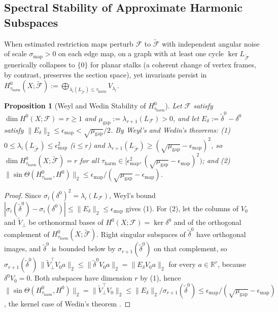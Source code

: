 \documentclass[11pt,a4paper]{article}
\newtheorem{proposition}{Proposition}
\theoremstyle{definition}
\theoremstyle{remark}
\newcommand{\R}{\mathbb{R}}
\begin{document}
\subsection{Spectral Stability of Approximate Harmonic Subspaces}

When estimated restriction maps perturb $\mathcal{F}$ to $\widetilde{\mathcal{F}}$ with independent angular noise of scale $\sigma_{\mathrm{map}} > 0$ on each edge map, on a graph with at least one cycle $\ker L_{\widetilde{\mathcal{F}}}$ generically collapses to $\{0\}$ for planar stalks (a coherent change of vertex frames, by contrast, preserves the section space), yet invariants persist in $H^0_{\tau_{\mathrm{harm}}}(X;\widetilde{\mathcal{F}}) := \bigoplus_{\lambda_i(L_{\widetilde{\mathcal{F}}}) \le \tau_{\mathrm{harm}}} V_{\lambda_i}$.

\begin{proposition}[Weyl and Wedin Stability of $H^0_{\tau_{\mathrm{harm}}}$]
\label{prop:davis_kahan}
Let $\mathcal{F}$ satisfy $\dim H^0(X;\mathcal{F}) = r \ge 1$ and $\mu_{\mathrm{gap}} := \lambda_{r+1}(L_{\mathcal{F}}) > 0$, and let $E_\delta := \tilde{\delta}^0 - \delta^0$ satisfy $\|E_\delta\|_2 \le \epsilon_{\mathrm{map}} < \sqrt{\mu_{\mathrm{gap}}}/2$. By Weyl's \cite{weyl1912asymptotische} and Wedin's \cite{wedin1972perturbation} theorems: (1) $0 \le \lambda_i(L_{\widetilde{\mathcal{F}}}) \le \epsilon_{\mathrm{map}}^2$ ($i \le r$) and $\lambda_{r+1}(L_{\widetilde{\mathcal{F}}}) \ge (\sqrt{\mu_{\mathrm{gap}}} - \epsilon_{\mathrm{map}})^2$, so $\dim H^0_{\tau_{\mathrm{harm}}}(X;\widetilde{\mathcal{F}}) = r$ for all $\tau_{\mathrm{harm}} \in [\epsilon_{\mathrm{map}}^2, (\sqrt{\mu_{\mathrm{gap}}} - \epsilon_{\mathrm{map}})^2)$; and (2) $\|\sin\Theta(H^0_{\tau_{\mathrm{harm}}}, H^0)\|_2 \le \epsilon_{\mathrm{map}} / (\sqrt{\mu_{\mathrm{gap}}} - \epsilon_{\mathrm{map}})$.
\end{proposition}

\begin{proof}
Since $\sigma_i(\delta^0)^2 = \lambda_i(L_{\mathcal{F}})$, Weyl's bound $|\sigma_i(\tilde{\delta}^0) - \sigma_i(\delta^0)| \le \|E_\delta\|_2 \le \epsilon_{\mathrm{map}}$ gives (1). For (2), let the columns of $V_0$ and $\tilde{V}_\perp$ be orthonormal bases of $H^0(X;\mathcal{F}) = \ker\delta^0$ and of the orthogonal complement of $H^0_{\tau_{\mathrm{harm}}}(X;\widetilde{\mathcal{F}})$. Right singular subspaces of $\tilde{\delta}^0$ have orthogonal images, and $\tilde{\delta}^0$ is bounded below by $\sigma_{r+1}(\tilde{\delta}^0)$ on that complement, so $\sigma_{r+1}(\tilde{\delta}^0)\,\|\tilde{V}_\perp^\top V_0 a\|_2 \le \|\tilde{\delta}^0 V_0 a\|_2 = \|E_\delta V_0 a\|_2$ for every $a \in \R^r$, because $\delta^0 V_0 = 0$. Both subspaces have dimension $r$ by (1), hence $\|\sin\Theta(H^0_{\tau_{\mathrm{harm}}}, H^0)\|_2 = \|\tilde{V}_\perp^\top V_0\|_2 \le \|E_\delta\|_2 / \sigma_{r+1}(\tilde{\delta}^0) \le \epsilon_{\mathrm{map}} / (\sqrt{\mu_{\mathrm{gap}}} - \epsilon_{\mathrm{map}})$, the kernel case of Wedin's theorem \cite{wedin1972perturbation}.
\end{proof}
\end{document}

